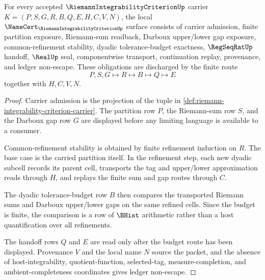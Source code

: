 \begin{theorem}
\label{thm:riemann-integrability-criterion-namecert-obligations}
For every accepted $\RiemannIntegrabilityCriterionUp$ carrier $K=(P,S,G,R,B,Q,E,H,C,V,N)$, the local $\NameCert_{\RiemannIntegrabilityCriterionUp}$ surface consists of carrier admission, finite partition exposure, Riemann-sum readback, Darboux upper/lower gap exposure, common-refinement stability, dyadic tolerance-budget exactness, $\RegSeqRatUp$ handoff, $\RealUp$ seal, componentwise transport, continuation replay, provenance, and ledger non-escape. These obligations are discharged by the finite route
$$
P,S,G\longmapsto R\longmapsto B\longmapsto Q\longmapsto E
$$
together with $H,C,V,N$.
\end{theorem}
\begin{proof}
Carrier admission is the projection of the tuple in \autoref{def:riemann-integrability-criterion-carrier}. The partition row $P$, the Riemann-sum row $S$, and the Darboux gap row $G$ are displayed before any limiting language is available to a consumer.

Common-refinement stability is obtained by finite refinement induction on $R$. The base case is the carried partition itself. In the refinement step, each new dyadic subcell records its parent cell, transports the tag and upper/lower approximation reads through $H$, and replays the finite sum and gap routes through $C$.

The dyadic tolerance-budget row $B$ then compares the transported Riemann sums and Darboux upper/lower gaps on the same refined cells. Since the budget is finite, the comparison is a row of $\BHist$ arithmetic rather than a host quantification over all refinements.

The handoff rows $Q$ and $E$ are read only after the budget route has been displayed. Provenance $V$ and the local name $N$ source the packet, and the absence of host-integrability, quotient-function, selected-tag, measure-completion, and ambient-completeness coordinates gives ledger non-escape.
\end{proof}

